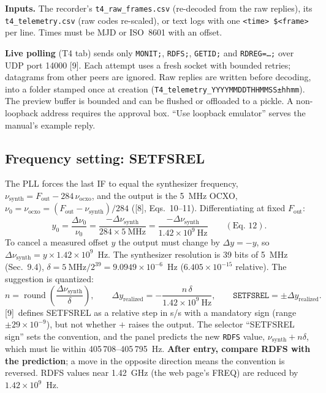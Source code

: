 \documentclass[11pt,a4paper]{article}
\newcommand{\tfourman}{[8]}
\newcommand{\tfournet}{[9]}
\begin{document}
\textbf{Inputs.} The recorder's \texttt{t4\_raw\_frames.csv} (re-decoded from the raw replies),
its \texttt{t4\_telemetry.csv} (raw codes re-scaled), or text logs with one
\texttt{<time> \$<frame>} per line. Times must be MJD or ISO~8601 with an offset.

\textbf{Live polling} (T4 tab) sends only \texttt{MONIT;}, \texttt{RDFS;}, \texttt{GETID;} and
\texttt{RDREG=\dots;} over UDP port 14000 \tfournet. Each attempt uses a fresh socket with bounded
retries; datagrams from other peers are ignored. Raw replies are written before decoding, into a
folder stamped once at creation (\texttt{T4\_telemetry\_YYYYMMDDTHHMMSS±hhmm}). The preview buffer
is bounded and can be flushed or offloaded to a pickle. A non-loopback address requires the
approval box. ``Use loopback emulator'' serves the manual's example reply.

\subsection{Frequency setting: SETFSREL}
The PLL forces the last IF to equal the synthesizer frequency, $\nu_{\mathrm{synth}}=F_{\mathrm{out}}-284\,\nu_{\mathrm{ocxo}}$,
and the output is the 5~MHz OCXO, $\nu_0=\nu_{\mathrm{ocxo}}=(F_{\mathrm{out}}-\nu_{\mathrm{synth}})/284$
(\tfourman, Eqs.~10--11). Differentiating at fixed $F_{\mathrm{out}}$:
\[
y_0=\frac{\Delta\nu_0}{\nu_0}=\frac{-\Delta\nu_{\mathrm{synth}}}{284\times5\ \mathrm{MHz}}
=\frac{-\Delta\nu_{\mathrm{synth}}}{1.42\times10^{9}\ \mathrm{Hz}}\qquad(\text{Eq.~12}).
\]
To cancel a measured offset $y$ the output must change by $\Delta y=-y$, so
$\Delta\nu_{\mathrm{synth}}=y\times1.42\times10^{9}$~Hz. The synthesizer resolution is
39 bits of 5~MHz (Sec.~9.4), $\delta=5\ \mathrm{MHz}/2^{39}=9.0949\times10^{-6}$~Hz
($6.405\times10^{-15}$ relative). The suggestion is quantized:
\[
n=\operatorname{round}\!\left(\frac{\Delta\nu_{\mathrm{synth}}}{\delta}\right),\qquad
\Delta y_{\mathrm{realized}}=-\frac{n\,\delta}{1.42\times10^{9}\ \mathrm{Hz}},\qquad
\texttt{SETFSREL}=\pm\Delta y_{\mathrm{realized}} .
\]
\tfournet\ defines SETFSREL as a relative step in s/s with a mandatory sign (range
$\pm29\times10^{-9}$), but not whether $+$ raises the output. The selector
``SETFSREL sign'' sets the convention, and the panel predicts the new \texttt{RDFS} value,
$\nu_{\mathrm{synth}}+n\delta$, which must lie within 405\,708--405\,795~Hz. \textbf{After entry, compare
RDFS with the prediction}; a move in the opposite direction means the convention is
reversed. RDFS values near 1.42~GHz (the web page's FREQ) are reduced by $1.42\times10^9$~Hz.
\end{document}
